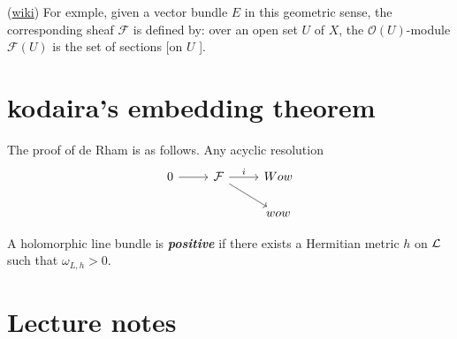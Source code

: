 \begin{remark}
	(\href{https://en.wikipedia.org/wiki/Coherent_sheaf#Basic_constructions_of_coherent_sheaves}{wiki}) For exmple, given a vector bundle $E$ in this geometric sense, the corresponding sheaf $\mathcal{F}$ is defined by: over an open set $U$ of $X$, the $\mathcal{O}(U)$-module $\mathcal{F}(U)$ is the set of sections [on  $U$ ].
\end{remark}

\section{kodaira's embedding theorem}
The proof of de Rham is as follows.
Any acyclic resolution
\[\begin{tikzcd}
	0\arrow[r]&\Fc\arrow[r,"i"]\arrow[dr]&Wow\\
	&&wow
\end{tikzcd}\]

\begin{defn}
	A holomorphic line bundle is \textbf{\textit{positive}} if there exists a Hermitian metric $h$ on $\mathcal{L}$ such that $\omega_{L,h}>0$.
\end{defn}
\clearpage

\section{Lecture notes}
